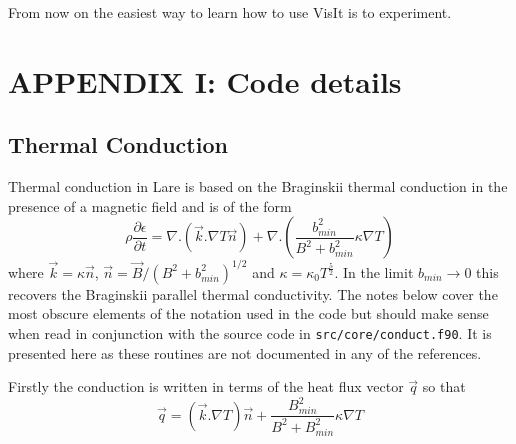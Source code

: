 \documentclass[11pt]{article}
\begin{document}
From now on the easiest way to learn how to use VisIt is to experiment.

\newpage
\section*{ APPENDIX I: Code details}
\subsection*{Thermal Conduction} %
\label{sec:thermal_code}  

Thermal conduction in Lare is based on the Braginskii thermal conduction in the presence of a magnetic field and is of the form\\
\[
\rho \frac{\partial \epsilon}{\partial t} = \nabla . \left(\vec{k} . \nabla T \vec{n} \right) +  \nabla . \left(  \frac{b_{min}^2}{B^2+b_{min}^2} \kappa \nabla T \right)
\]
where $\vec{k} = \kappa \vec{n}$, $\vec{n} = \vec{B}/(B^2+b_{min}^2)^{1/2}$ and $\kappa = \kappa_0  T^\frac{5}{2}$. In the limit $b_{min}\to 0$ this recovers the Braginskii parallel thermal conductivity. The notes below cover the most obscure elements of the notation used in the code but should make sense when read in conjunction with the source code in {\tt src/core/conduct.f90}. It is presented here as these routines are not documented in any of the references. 

Firstly the conduction is written in terms of the heat flux vector $\vec{q}$ so that
\[
\vec{q}= \left(\vec{k} . \nabla T \right) \vec{n} +    \frac{B_{min}^2}{B^2+B_{min}^2} \kappa \nabla T
\]
\end{document}
